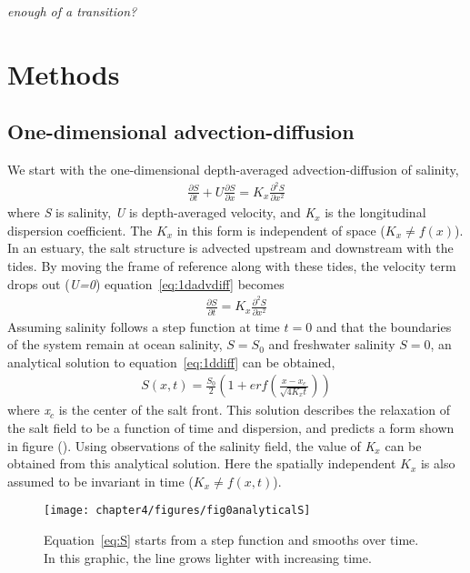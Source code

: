 \emph{enough of a transition?}

\section{Methods} \label{sec:ch4methods}

\subsection{One-dimensional advection-diffusion} \label{ssec:1dadvdif}

We start with the one-dimensional depth-averaged advection-diffusion of salinity,
\begin{eqnarray}
\frac{\partial S}{\partial t} + U\frac{\partial S}{\partial x} = K_x\frac{\partial^2S}{\partial x^2} \label{eq:1dadvdiff}
\end{eqnarray}
where \emph{S} is salinity, \emph{U} is depth-averaged velocity, and \emph{K$_x$} is the longitudinal dispersion coefficient. The $K_x$ in this form is independent of space ($K_x\ne f(x)$).  In an estuary, the salt structure is advected upstream and downstream with the tides. By moving the frame of reference along with these tides, the velocity term drops out (\emph{U=0}) equation~\ref{eq:1dadvdiff} becomes
\begin{eqnarray}
\frac{\partial S}{\partial t} = K_x\frac{\partial^2S}{\partial x^2} \label{eq:1ddiff}
\end{eqnarray}
Assuming salinity follows a step function at time $t=0$ and that the boundaries of the system remain at ocean salinity, $S=S_0$ and freshwater salinity $S=0$, an analytical solution to equation~\ref{eq:1ddiff} can be obtained,
\begin{eqnarray}
S(x,t) = \frac{S_0}{2}\left(1+erf\left(\frac{x-x_c}{\sqrt{4K_xt}}\right)\right) \label{eq:S}
\end{eqnarray}
where \emph{x$_c$} is the center of the salt front. This solution describes the relaxation of the salt field to be a function of time and dispersion, and predicts a form shown in figure (). Using observations of the salinity field, the value of \emph{K$_x$} can be obtained from this analytical solution. Here the spatially independent $K_x$ is also assumed to be invariant in time ($K_x\ne f(x,t)$). 

\begin{figure}[h!]
\texttt{[image: chapter4/figures/fig0analyticalS]}
\caption{Equation~\ref{eq:S} starts from a step function and smooths over time. In this graphic, the line grows lighter with increasing time.} \label{fig:Sgraphic}
\end{figure}

